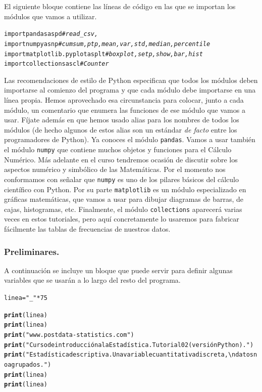 \documentclass[10pt,a4paper]{article}\usepackage[]{graphicx}\usepackage[]{color}
\makeatletter
\newcommand{\hlnum}[1]{\textcolor[rgb]{0.686,0.059,0.569}{#1}}%
\newcommand{\hlstr}[1]{\textcolor[rgb]{0.192,0.494,0.8}{#1}}%
\newcommand{\hlcom}[1]{\textcolor[rgb]{0.678,0.584,0.686}{\textit{#1}}}%
\newcommand{\hlopt}[1]{\textcolor[rgb]{0,0,0}{#1}}%
\newcommand{\hlstd}[1]{\textcolor[rgb]{0.345,0.345,0.345}{#1}}%
\newcommand{\hlkwb}[1]{\textcolor[rgb]{0.69,0.353,0.396}{#1}}%
\newcommand{\hlkwd}[1]{\textcolor[rgb]{0.737,0.353,0.396}{\textbf{#1}}}%
\newenvironment{kframe}{%
 \def\at@end@of@kframe{}%
 \ifinner\ifhmode%
  \def\at@end@of@kframe{\end{minipage}}%
  \begin{minipage}{\columnwidth}%
 \fi\fi%
 \def\FrameCommand##1{\hskip\@totalleftmargin \hskip-\fboxsep
 \colorbox{shadecolor}{##1}\hskip-\fboxsep
     \hskip-\linewidth \hskip-\@totalleftmargin \hskip\columnwidth}%
 \MakeFramed {\advance\hsize-\width
   \@totalleftmargin\z@ \linewidth\hsize
   \@setminipage}}%
 {\par\unskip\endMakeFramed%
 \at@end@of@kframe}
\newenvironment{knitrout}{}{} %
\newcounter {cont01}
\makeatother
\begin{document}
El siguiente bloque contiene las líneas de código en las que se importan los módulos que vamos a utilizar.
\begin{knitrout}
\color{fgcolor}\begin{kframe}
\begin{alltt}
import pandas as pd \hlcom{# read_csv, }
import numpy as np \hlcom{# cumsum, ptp, mean, var, std, median, percentile}
import matplotlib.pyplot as plt \hlcom{# boxplot, setp, show, bar, hist}
import collections as cl \hlcom{# Counter}
\end{alltt}
\end{kframe}
\end{knitrout}
Las recomendaciones de estilo de Python especifican que todos los módulos deben importarse al comienzo del programa y que cada módulo debe importarse en una línea propia. Hemos aprovechado esa circunstancia para colocar, junto a cada módulo, un comentario que enumera las funciones de ese módulo que vamos a usar. Fíjate además en que hemos usado alias para los nombres de todos los módulos (de hecho algunos de estos alias son un estándar {\em de facto} entre los programadores de Python). Ya conoces el módulo {\tt pandas}. Vamos a usar también el módulo {\tt numpy} que contiene muchos objetos y funciones para el Cálculo Numérico. Más adelante en el curso tendremos ocasión de discutir sobre los aspectos numérico y simbólico de las Matemáticas. Por el momento nos conformamos con señalar que {\tt numpy} es uno de los pilares básicos del cálculo científico con Python. Por su parte {\tt matplotlib} es un módulo especializado en gráficas matemáticas, que vamos a usar para dibujar diagramas de barras, de cajas, histogramas, etc. Finalmente, el módulo {\tt collections} aparecerá varias veces en estos tutoriales, pero aquí concretamente lo usaremos para fabricar fácilmente las tablas de frecuencias de nuestros datos.


\subsubsection*{Preliminares.}
\label{tut02:subsubsec:preliminares}

A continuación se incluye un bloque que puede servir para definir algunas variables que se usarán a lo largo del resto del programa.
\begin{knitrout}
\color{fgcolor}\begin{kframe}
\begin{alltt}
\hlstd{linea} \hlkwb{=} \hlstr{"_"} \hlopt{*} \hlnum{75}

\hlkwd{print}\hlstd{(linea)}
\hlkwd{print}\hlstd{(linea)}
\hlkwd{print}\hlstd{(}\hlstr{"www.postdata-statistics.com"}\hlstd{)}
\hlkwd{print}\hlstd{(}\hlstr{"Curso de introducción a la Estadística. Tutorial02 (versión Python)."}\hlstd{)}
\hlkwd{print}\hlstd{(}\hlstr{"Estadística descriptiva. Una variable cuantitativa discreta,\textbackslash{}n datos no agrupados."}\hlstd{)}
\hlkwd{print}\hlstd{(linea)}
\hlkwd{print}\hlstd{(linea)}
\end{alltt}
\end{kframe}
\end{knitrout}
\end{document}
